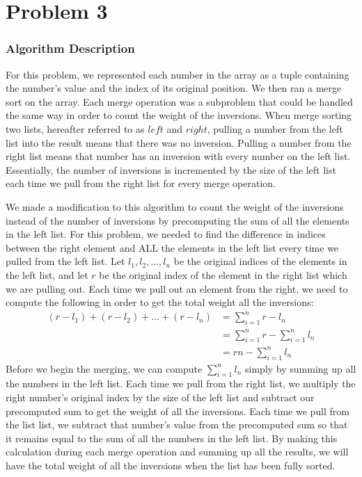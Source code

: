 \documentclass{math}
\begin{document}
\section*{Problem 3}

\subsubsection*{Algorithm Description}
For this problem, we represented each number in the array as a tuple containing
the number's value and the index of its original position. We then ran a merge
sort on the array. Each merge operation was a subproblem that could be handled
the same way in order to count the weight of the inversions. When merge sorting
two lists, hereafter referred to as \( left \) and \( right \), pulling a number
from the left list into the result means that there was no inversion. Pulling a
number from the right list means that number has an inversion with every number
on the left list. Essentially, the number of inversions is incremented by the
size of the left list each time we pull from the right list for every merge
operation. \par
We made a modification to this algorithm to count the weight of the inversions
instead of the number of inversions by precomputing the sum of all the elements
in the left list. For this problem, we needed to find the difference in indices
between the right element and ALL the elements in the left list every time we
pulled from the left list. Let \( l_1,l_2,\dots,l_n \) be the original indices
of the elements in the left list, and let \( r \) be the original index of the
element in the right list which we are pulling out. Each time we pull out an
element from the right, we need to compute the following in order to get the
total weight all the inversions:
\begin{align*}
  (r-l_1)+(r-l_2)+\dots+(r-l_n) &= \sum_{i=1}^{n}r-l_n \\
  &= \sum_{i=1}^{n}r-\sum_{i=1}^{n}l_n \\
  &= rn-\sum_{i=1}^{n}l_n
\end{align*}
Before we begin the merging, we can compute \( \sum_{i=1}^{n}l_n \) simply by
summing up all the numbers in the left list. Each time we pull from the right
list, we multiply the right number's original index by the size of the
left list and subtract our precomputed sum to get the weight of all the
inversions. Each time we pull from the list list, we subtract that number's
value from the precomputed sum so that it remains equal to the sum of all
the numbers in the left list. By making this calculation during each merge
operation and summing up all the results, we will have the total weight of
all the inversions when the list has been fully sorted.
\end{document}

